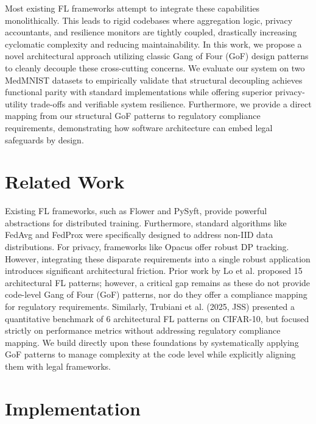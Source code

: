 \documentclass[10pt, conference]{IEEEtran}
\begin{document}
Most existing FL frameworks attempt to integrate these capabilities monolithically. This leads to rigid codebases where aggregation logic, privacy accountants, and resilience monitors are tightly coupled, drastically increasing cyclomatic complexity and reducing maintainability. In this work, we propose a novel architectural approach utilizing classic Gang of Four (GoF) design patterns to cleanly decouple these cross-cutting concerns. We evaluate our system on two MedMNIST datasets to empirically validate that structural decoupling achieves functional parity with standard implementations while offering superior privacy-utility trade-offs and verifiable system resilience. Furthermore, we provide a direct mapping from our structural GoF patterns to regulatory compliance requirements, demonstrating how software architecture can embed legal safeguards by design.

\section{Related Work}
Existing FL frameworks, such as Flower and PySyft, provide powerful abstractions for distributed training. Furthermore, standard algorithms like FedAvg and FedProx were specifically designed to address non-IID data distributions. For privacy, frameworks like Opacus offer robust DP tracking. However, integrating these disparate requirements into a single robust application introduces significant architectural friction. Prior work by Lo et al. proposed 15 architectural FL patterns; however, a critical gap remains as these do not provide code-level Gang of Four (GoF) patterns, nor do they offer a compliance mapping for regulatory requirements. Similarly, Trubiani et al. (2025, JSS) presented a quantitative benchmark of 6 architectural FL patterns on CIFAR-10, but focused strictly on performance metrics without addressing regulatory compliance mapping. We build directly upon these foundations by systematically applying GoF patterns to manage complexity at the code level while explicitly aligning them with legal frameworks.

\section{Implementation}
\end{document}
